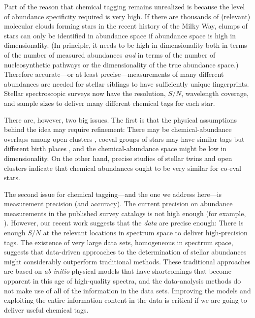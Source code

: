 \documentclass[12pt, letterpaper, preprint]{aastex}
\newcommand{\foreign}[1]{\textsl{#1}}
\begin{document}
Part of the reason that chemical tagging remains unrealized
is because the level of abundance specificity required
is very high.
If there are thousands of (relevant) molecular clouds forming stars in
the recent history of the Milky Way, clumps of stars can only be
identified in abundance space if abundance space is high in dimensionality.
(In principle, it needs to be high in dimensionality both in terms
of the number of measured abundances \emph{and} in terms of the number of
nucleosynthetic pathways or the dimensionality of the true abundance
space.)
Therefore accurate---or at
least precise---measurements of many different abundances are needed
for stellar siblings to have sufficiently unique fingerprints.
Stellar spectroscopic surveys now have the resolution,
$S/N$, wavelength coverage, and sample sizes to deliver many
different chemical tags for each star.

There are, however, two big issues.
The first is that the physical assumptions behind the idea may require
refinement:
There may be chemical-abundance overlaps among open clusters
\citep{blancocuaresma}, coeval groups of stars may have similar tags
but different birth places \citep{mitschang}, and the
chemical-abundance space might be low in dimensionality.
On the other hand, precise studies of stellar twins \citep{melendez, jofre}
and open clusters \citep{bovy} indicate that chemical abundances ought to be
very similar for co-eval stars.

The second issue for chemical tagging---and the one we address
here---is measurement precision (and accuracy).
The current precision on abundance measurements in the published
survey catalogs is not high enough (for example, \citealt{martell, ting}).
However, our recent work \citep{thecannon} suggests that the \emph{data}
are precise enough: There is enough $S/N$ at the relevant
locations in spectrum space to deliver high-precision tags.
The existence of very large data sets, homogeneous in spectrum
space, suggests that data-driven approaches to the determination
of stellar abundances might considerably outperform traditional
methods.
These traditional approaches are based on \foreign{ab-initio} physical models
that have shortcomings that become apparent in this age of
high-quality spectra, and the data-analysis methods do not make use of
all of the information in the data sets.
Improving the models and exploiting the entire information
content in the data is critical if we are going to deliver useful
chemical tags.
\end{document}
